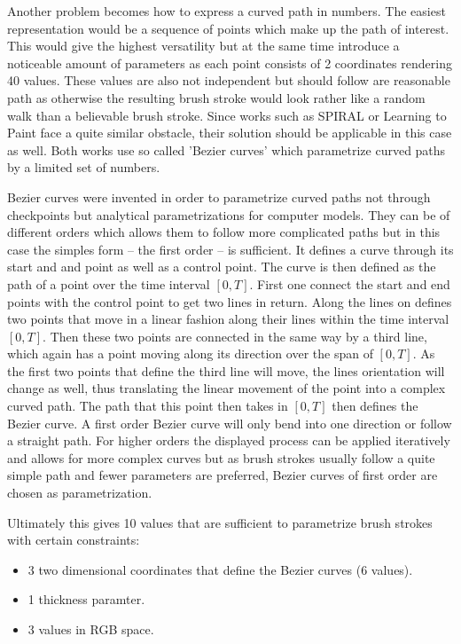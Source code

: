 Another problem becomes how to express a curved path in numbers.
The easiest representation would be a sequence of points which make up the path of
interest.
This would give the highest versatility but at the same time introduce a noticeable
amount of parameters as each point consists of 2 coordinates rendering 40 values.
These values are also not independent but should follow are reasonable path as otherwise
the resulting brush stroke would look rather like a random walk than a believable
brush stroke.
Since works such as SPIRAL or Learning to Paint face a quite similar obstacle, their
solution should be applicable in this case as well.
Both works use so called 'Bezier curves' which parametrize curved paths by a limited
set of numbers.

Bezier curves were invented in order to parametrize curved paths not through checkpoints
but analytical parametrizations for computer models.
They can be of different orders which allows them to follow more complicated paths
but in this case the simples form -- the first order -- is sufficient.
It defines a curve through its start and and point as well as a control point.
The curve is then defined as the path of a point over the time interval $[0, T]$.
First one connect the start and end points with the control point to get two lines
in return.
Along the lines on defines two points that move in a linear fashion along their lines
within the time interval $[0, T]$.
Then these two points are connected in the same way by a third line, which again
has a point moving along its direction over the span of $[0, T]$.
As the first two points that define the third line will move, the lines orientation
will change as well, thus translating the linear movement of the point into a complex
curved path.
The path that this point then takes in $[0, T]$ then defines the Bezier curve.
A first order Bezier curve will only bend into one direction or follow a straight path.
For higher orders the displayed process can be applied iteratively and allows for
more complex curves but as brush strokes usually follow a quite simple path and 
fewer parameters are preferred, Bezier curves of first order are chosen as parametrization.

Ultimately this gives 10 values that are sufficient to parametrize brush strokes
with certain constraints:
\begin{itemize}
    \item 3 two dimensional coordinates that define the Bezier curves (6 values).
    \item 1 thickness paramter.
    \item 3 values in RGB space.
\end{itemize}



